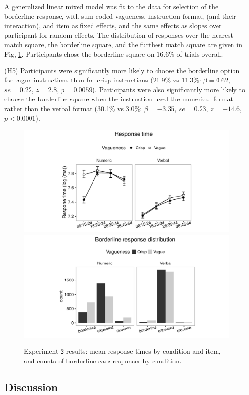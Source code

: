 \documentclass[%
man,		%
floatsintext,%
apacite%
]{apa6} %
\begin{document}
A generalized linear mixed model \cite{jaeger2008categorical} was fit to the data for selection of the borderline response, with sum-coded vagueness, instruction format, (and their interaction), and item as fixed effects, and the same effects as slopes over participant for random effects. The distribution of responses over the nearest match square, the borderline square, and the furthest match square are given in Fig, \ref{resultse2}. Participants chose the borderline square on $16.6\%$ of trials overall.
{\small 
\begin{APAenumerate}
	\item [(H5)] Participants were significantly more likely to choose the borderline option for vague instructions than for crisp instructions (21.9\% vs 11.3\%: $\beta=0.62$, $se=0.22$, $z=2.8$, $p=0.0059$). Participants were also significantly more likely to choose the borderline square when the instruction used the numerical format rather than the verbal format (30.1\% vs 3.0\%: $\beta=-3.35$, $se=0.23$, $z=-14.6$, $p<0.0001$). 
\end{APAenumerate}
}

\begin{figure}[htbp]
\centering
\includegraphics[trim = 20mm 0mm 35mm 0mm, clip, width=.49\textwidth]{images/e2-rtplot-1.pdf}
\includegraphics[trim = 20mm 0mm 35mm 0mm, clip, width=.49\textwidth]{images/e2-blBarChart-1}
\caption{Experiment 2 results: mean response times by condition and item, and counts of borderline case responses by condition.}
\label{resultse2}
\end{figure}

\subsection{Discussion} %
\end{document}
